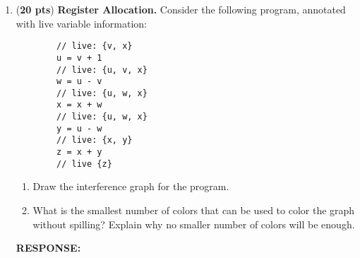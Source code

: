 \documentclass[10pt]{article}
\newcommand {\response}{{\color{blue}\textbf{RESPONSE:}\\}}
\newcommand {\pts}[1]{({\bf #1 pts})}
\begin{document}
\begin{enumerate}
    \item \pts{20} \textbf{Register Allocation. } Consider the following program, annotated with live variable information:
    \begin{verbatim}
        // live: {v, x}
        u = v + 1
        // live: {u, v, x}
        w = u - v
        // live: {u, w, x}
        x = x + w
        // live: {u, w, x}
        y = u - w
        // live: {x, y}
        z = x + y
        // live {z}
    \end{verbatim}
    \begin{enumerate}
        \item Draw the interference graph for the program.
        \item What is the smallest number of colors that can be used to color the graph without spilling?
Explain why no smaller number of colors will be enough.
    \end{enumerate} 
    \response

\end{enumerate}
\end{document}
